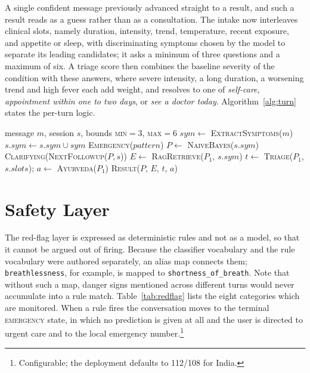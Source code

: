 \documentclass[conference]{IEEEtran}
\newcommand{\code}[1]{\texttt{\small #1}}
\begin{document}
A single confident message previously advanced straight to a result, and such
a result reads as a guess rather than as a consultation. The intake now
interleaves clinical slots, namely duration, intensity, trend, temperature,
recent exposure, and appetite or sleep, with discriminating symptoms chosen
by the model to separate its leading candidates; it asks a minimum of three
questions and a maximum of six. A triage score then combines the baseline
severity of the condition with these answers, where severe intensity, a long
duration, a worsening trend and high fever each add weight, and resolves to
one of \textit{self-care}, \textit{appointment within one to two days}, or
\textit{see a doctor today}. Algorithm~\ref{alg:turn} states the per-turn
logic.

\begin{algorithm}[t]
\footnotesize
\caption{Per-turn orchestration (safety first)}
\label{alg:turn}
\begin{algorithmic}[1]
\Require message $m$, session $s$, bounds \textsc{min}$=3$, \textsc{max}$=6$
\State $sym \gets$ \textsc{ExtractSymptoms}($m$) 
\State $s.sym \gets s.sym \cup sym$
  \State \Return \textsc{Emergency}($pattern$) 
\EndIf
\State $P \gets$ \textsc{NaiveBayes}($s.sym$) 
  \State \Return \textsc{Clarifying}(\textsc{NextFollowup}($P,s$))
\EndIf
\State $E \gets$ \textsc{RagRetrieve}($P_1$, $s.sym$) 
\State $t \gets$ \textsc{Triage}($P_1$, $s.slots$);\quad
       $a \gets$ \textsc{Ayurveda}($P_1$)
\State \Return \textsc{Result}($P$, $E$, $t$, $a$)
\end{algorithmic}
\end{algorithm}

\section{Safety Layer}

The red-flag layer is expressed as deterministic rules and not as a model, so
that it cannot be argued out of firing. Because the classifier vocabulary and
the rule vocabulary were authored separately, an alias map connects them;
\code{breathlessness}, for example, is mapped to
\code{shortness\_of\_breath}. Note that without such a map, danger signs
mentioned across different turns would never accumulate into a rule match.
Table~\ref{tab:redflag} lists the eight categories which are monitored. When
a rule fires the conversation moves to the terminal \textsc{emergency} state,
in which no prediction is given at all and the user is directed to urgent
care and to the local emergency number.\footnote{Configurable; the deployment
defaults to 112/108 for India.}
\end{document}
